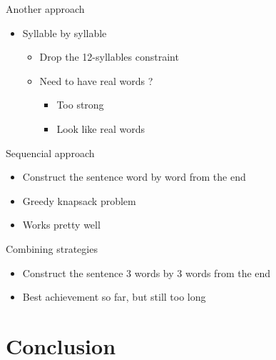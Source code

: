 \documentclass[unknownkeysallowed]{beamer}
\begin{document}
\begin{frame}[fragile]{Another approach}
\begin{itemize}
\item Syllable by syllable
\medskip

\begin{itemize}
\item Drop the 12-syllables constraint
\medskip

\item Need to have real words ? 
\medskip

\begin{itemize}
\item Too strong
\medskip

\item Look like real words
\end{itemize}
\end{itemize}
\end{itemize}
\end{frame}


\begin{frame}[fragile]{Sequencial approach}
\begin{itemize}
\item Construct the sentence word by word from the end
\medskip

\item Greedy knapsack problem
\medskip

\item Works pretty well
\end{itemize}
\end{frame}


\begin{frame}[fragile]{Combining strategies}
\begin{itemize}
\item Construct the sentence 3 words by 3 words from the end
\medskip

\item Best achievement so far, but still too long
\end{itemize}
\end{frame}

\section{Conclusion}
\end{document}
